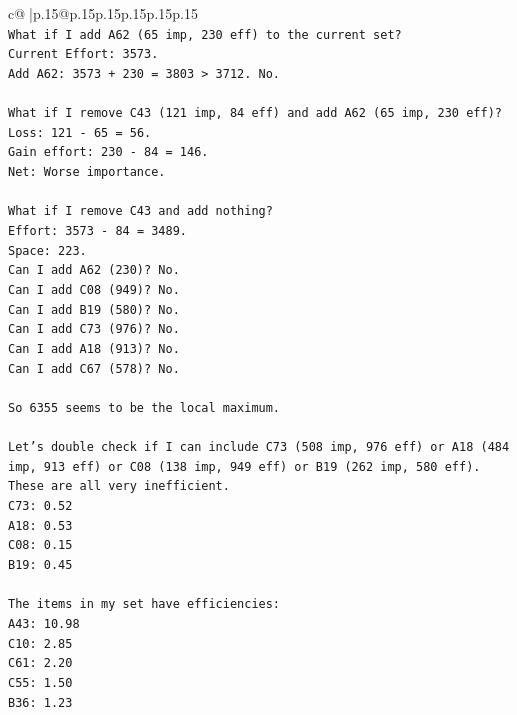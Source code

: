 \documentclass{article}
\begin{document}
{\begin{supertabular}{c@{$\;$}|p{.15\linewidth}@{}p{.15\linewidth}p{.15\linewidth}p{.15\linewidth}p{.15\linewidth}p{.15\linewidth}}
{{{\\ 
\texttt{What if I add A62 (65 imp, 230 eff) to the current set?} \\
\texttt{Current Effort: 3573.} \\
\texttt{Add A62: 3573 + 230 = 3803 > 3712. No.} \\
\\ 
\texttt{What if I remove C43 (121 imp, 84 eff) and add A62 (65 imp, 230 eff)?} \\
\texttt{Loss: 121 {-} 65 = 56.} \\
\texttt{Gain effort: 230 {-} 84 = 146.} \\
\texttt{Net: Worse importance.} \\
\\ 
\texttt{What if I remove C43 and add nothing?} \\
\texttt{Effort: 3573 {-} 84 = 3489.} \\
\texttt{Space: 223.} \\
\texttt{Can I add A62 (230)? No.} \\
\texttt{Can I add C08 (949)? No.} \\
\texttt{Can I add B19 (580)? No.} \\
\texttt{Can I add C73 (976)? No.} \\
\texttt{Can I add A18 (913)? No.} \\
\texttt{Can I add C67 (578)? No.} \\
\\ 
\texttt{So 6355 seems to be the local maximum.} \\
\\ 
\texttt{Let's double check if I can include C73 (508 imp, 976 eff) or A18 (484 imp, 913 eff) or C08 (138 imp, 949 eff) or B19 (262 imp, 580 eff).} \\
\texttt{These are all very inefficient.} \\
\texttt{C73: 0.52} \\
\texttt{A18: 0.53} \\
\texttt{C08: 0.15} \\
\texttt{B19: 0.45} \\
\\ 
\texttt{The items in my set have efficiencies:} \\
\texttt{A43: 10.98} \\
\texttt{C10: 2.85} \\
\texttt{C61: 2.20} \\
\texttt{C55: 1.50} \\
\texttt{B36: 1.23} \\
}}}
\end{supertabular}}
\end{document}
